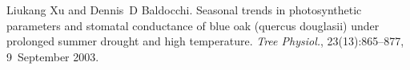 \begin{DoxyDescription}
\item[\label{_CITEREF_Xu2003-d75}%
\mbox{[}81\mbox{]}]Liukang Xu and Dennis~D Baldocchi. Seasonal trends in photosynthetic parameters and stomatal conductance of blue oak (quercus douglasii) under prolonged summer drought and high temperature. {\itshape Tree Physiol.}, 23(13)\+:865--877, 9~September 2003.


\end{DoxyDescription}